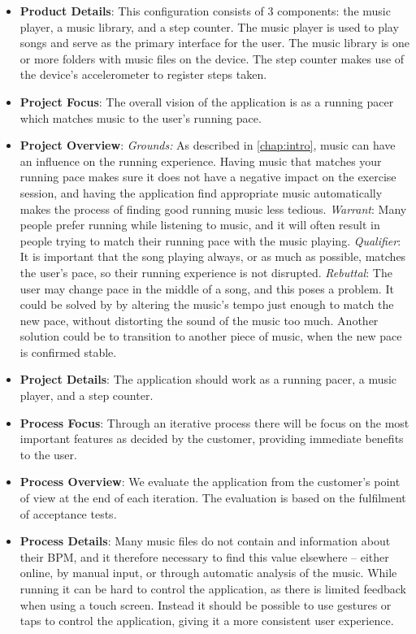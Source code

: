 \begin{itemize}
\item \textbf{Product Details}: This configuration consists of 3 components: the music player, a music library, and a step counter. The music player is used to play songs and serve as the primary interface for the user. The music library is one or more folders with music files on the device. The step counter makes use of the device's accelerometer to register steps taken.

\item \textbf{Project Focus}: The overall vision of the application is as a running pacer which matches music to the user's running pace.

\item \textbf{Project Overview}: \newline
\textit{Grounds:} As described in \cref{chap:intro}, music can have an influence on the running experience. Having music that matches your running pace makes sure it does not have a negative impact on the exercise session, and having the application find appropriate music automatically makes the process of finding good running music less tedious. \newline
\textit{Warrant}: Many people prefer running while listening to music, and it will often result in people trying to match their running pace with the music playing. \newline
\textit{Qualifier}: It is important that the song playing always, or as much as possible, matches the user's pace, so their running experience is not disrupted. \newline
\textit{Rebuttal}: The user may change pace in the middle of a song, and this poses a problem. It could be solved by by altering the music's tempo just enough to match the new pace, without distorting the sound of the music too much. Another solution could be to transition to another piece of music, when the new pace is confirmed stable.

\item \textbf{Project Details}: The application should work as a running pacer, a music player, and a step counter.

\item \textbf{Process Focus}: Through an iterative process there will be focus on the most important features as decided by the customer, providing immediate benefits to the user.

\item \textbf{Process Overview}: We evaluate the application from the customer's point of view at the end of each iteration. The evaluation is based on the fulfilment of acceptance tests.

\item \textbf{Process Details}: Many music files do not contain and information about their BPM, and it therefore necessary to find this value elsewhere -- either online, by manual input, or through automatic analysis of the music. \newline
While running it can be hard to control the application, as there is limited feedback when using a touch screen. Instead it should be possible to use gestures or taps to control the application, giving it a more 
consistent user experience.
\end{itemize}